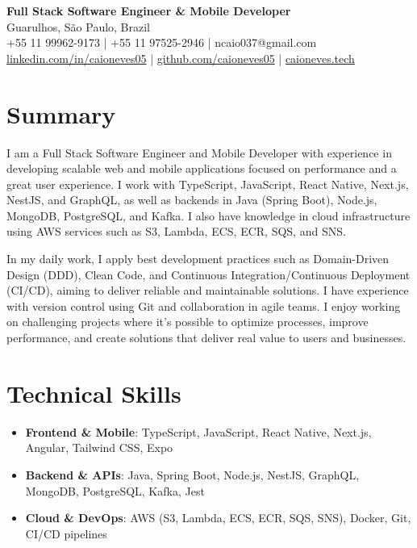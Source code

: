 \documentclass[11pt,letterpaper]{article}
\begin{document}
\begin{center}
    \textbf{\Large Full Stack Software Engineer \& Mobile Developer} \\
    \vspace{5pt}
    Guarulhos, São Paulo, Brazil \\
    +55 11 99962-9173 | +55 11 97525-2946 | ncaio037@gmail.com \\
    \href{https://www.linkedin.com/in/caioneves05}{linkedin.com/in/caioneves05} |
    \href{https://github.com/caioneves05}{github.com/caioneves05} |
    \href{http://caioneves.tech}{caioneves.tech}
\end{center}

\section{Summary}
I am a Full Stack Software Engineer and Mobile Developer with experience in developing scalable web and mobile applications focused on performance and a great user experience. I work with TypeScript, JavaScript, React Native, Next.js, NestJS, and GraphQL, as well as backends in Java (Spring Boot), Node.js, MongoDB, PostgreSQL, and Kafka. I also have knowledge in cloud infrastructure using AWS services such as S3, Lambda, ECS, ECR, SQS, and SNS.

In my daily work, I apply best development practices such as Domain-Driven Design (DDD), Clean Code, and Continuous Integration/Continuous Deployment (CI/CD), aiming to deliver reliable and maintainable solutions. I have experience with version control using Git and collaboration in agile teams. I enjoy working on challenging projects where it’s possible to optimize processes, improve performance, and create solutions that deliver real value to users and businesses.

\section{Technical Skills}
\begin{itemize}[leftmargin=*]
    \item \textbf{Frontend \& Mobile}: TypeScript, JavaScript, React Native, Next.js, Angular, Tailwind CSS, Expo
    \item \textbf{Backend \& APIs}: Java, Spring Boot, Node.js, NestJS, GraphQL, MongoDB, PostgreSQL, Kafka, Jest
    \item \textbf{Cloud \& DevOps}: AWS (S3, Lambda, ECS, ECR, SQS, SNS), Docker, Git, CI/CD pipelines
\end{itemize}
\end{document}
